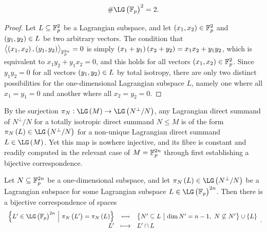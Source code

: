 \begin{proposition}
\label{prop:lagrangianbase}
$$ \#\LG\br{\FF_p}^2 = 2. $$
\end{proposition}

\begin{proof}
Let $ L \subseteq \mathbb{F}_p^2 $ be a Lagrangian subspace, and let $ \br{x_1, x_2} \in \FF_p^2 $ and $ \br{y_1, y_2} \in L $ be two arbitrary vectors. The condition that $ \abr{\br{x_1, x_2}, \br{y_1, y_2}}_{\FF_p^{2n}} = 0 $ is simply $ \br{x_1 + y_1}\br{x_2 + y_2} = x_1x_2 + y_1y_2 $, which is equivalent to $ x_1y_2 + y_1x_2 = 0 $, and this holds for all vectors $ \br{x_1, x_2} \in \FF_p^2 $. Since $ y_1y_2 = 0 $ for all vectors $ \br{y_1, y_2} \in L $ by total isotropy, there are only two distinct possibilities for the one-dimensional Lagrangian subspace $ L $, namely one where all $ x_1 = y_1 = 0 $ and another where all $ x_2 = y_2 = 0 $.
\end{proof}

By the surjection $ \pi_N : \LG\br{M} \to \LG\br{N^\perp / N} $, any Lagrangian direct summand of $ N^\perp / N $ for a totally isotropic direct summand $ N \le M $ is of the form $ \pi_N\br{L} \in \LG\br{N^\perp / N} $ for a non-unique Lagrangian direct summand $ L \in \LG\br{M} $. Yet this map is nowhere injective, and its fibre is constant and readily computed in the relevant case of $ M = \mathbb{F}_p^{2n} $ through first establishing a bijective correspondence.

\begin{lemma}
\label{lem:lagrangianfibre}
Let $ N \subseteq \mathbb{F}_p^{2n} $ be a one-dimensional subspace, and let $ \pi_N\br{L} \in \LG\br{N^\perp / N} $ be a Lagrangian subspace for some Lagrangian subspace $ L \in \LG\br{\FF_p}^{2n} $. Then there is a bijective correspondence of spaces
$$ \bijection{\cbr{L' \in \LG\br{\FF_p}^{2n} \st \pi_N\br{L'} = \pi_N\br{L}}}{\cbr{N' \subseteq L \st \dim N' = n - 1, \ N \not\subseteq N'} \cup \cbr{L}}{L'}{L' \cap L}. $$
\end{lemma}


